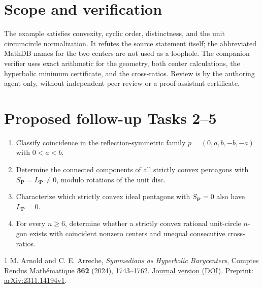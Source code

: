 \documentclass[11pt]{article}
\begin{document}
\section*{Scope and verification}
The example satisfies convexity, cyclic order, distinctness, and the unit
circumcircle normalization. It refutes the source statement itself; the
abbreviated MathDB names for the two centers are not used as a loophole.
The companion verifier uses exact arithmetic for the geometry, both center
calculations, the hyperbolic minimum certificate, and the cross-ratios.
Review is by the authoring agent only, without independent peer review or
a proof-assistant certificate.

\section*{Proposed follow-up Tasks 2--5}
\begin{enumerate}[label=Task \arabic*:,start=2,leftmargin=4.6em]
\item Classify coincidence in the reflection-symmetric family
$p=(0,a,b,-b,-a)$ with $0<a<b$.
\item Determine the connected components of all strictly convex pentagons
with $S_{\mathbf P}=L_{\mathbf P}\ne0$, modulo rotations of the unit disc.
\item Characterize which strictly convex ideal pentagons with
$S_{\mathbf P}=0$ also have $L_{\mathbf P}=0$.
\item For every $n\ge6$, determine whether a strictly convex rational
unit-circle $n$-gon exists with coincident nonzero centers and unequal
consecutive cross-ratios.
\end{enumerate}

\begin{thebibliography}{1}
 M. Arnold and C. E. Arreche,
\emph{Symmedians as Hyperbolic Barycenters},
Comptes Rendus Math\'ematique \textbf{362} (2024), 1743--1762.
\href{https://doi.org/10.5802/crmath.677}{Journal version (DOI)}.
Preprint: \href{https://arxiv.org/abs/2311.14194}{arXiv:2311.14194v1}.
\end{thebibliography}
\end{document}
